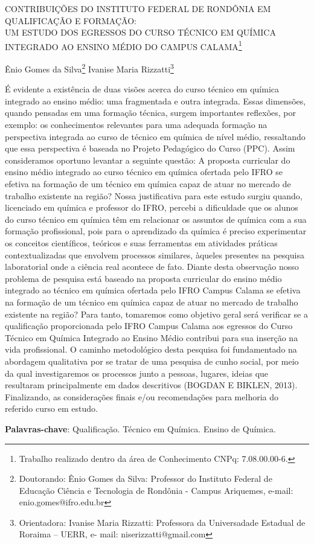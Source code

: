 \documentclass[article,12pt,onesidea,4paper,english,brazil]{abntex2}
\begin{document}
	
	
	\frenchspacing 
	
	\begin{center}
		\LARGE \MakeUppercase{Contribuições do Instituto Federal de Rondônia em qualificação e formação:}\\\MakeUppercase{
		um estudo dos egressos do Curso Técnico em Química Integrado ao Ensino Médio do Campus Calama}\footnote{Trabalho realizado dentro da área de Conhecimento CNPq: 7.08.00.00-6.}
		
		\normalsize
		Ênio Gomes da Silva\footnote{Doutorando: Ênio Gomes da Silva: Professor do Instituto Federal de Educação Ciência e Tecnologia de Rondônia - Campus Ariquemes, e-mail: enio.gomes@ifro.edu.br} 
		Ivanise Maria Rizzatti\footnote{Orientadora: Ivanise Maria Rizzatti: Professora da Universadade Estadual de Roraima – UERR, e-
			mail: niserizzatti@gmail.com} 
	\end{center}
	
	\noindent É evidente a existência de duas visões acerca do curso técnico em química integrado ao
	ensino médio: uma fragmentada e outra integrada. Essas dimensões, quando pensadas em
	uma formação técnica, surgem importantes reflexões, por exemplo: os conhecimentos
	relevantes para uma adequada formação na perspectiva integrada ao curso de técnico em
	química de nível médio, ressaltando que essa perspectiva é baseada no Projeto Pedagógico
	do Curso (PPC). Assim consideramos oportuno levantar a seguinte questão: A proposta
	curricular do ensino médio integrado ao curso técnico em química ofertada pelo IFRO se
	efetiva na formação de um técnico em química capaz de atuar no mercado de trabalho
	existente na região? Nossa justificativa para este estudo surgiu quando, licenciado em
	química e professor do IFRO, percebi a dificuldade que os alunos do curso técnico em
	química têm em relacionar os assuntos de química com a sua formação profissional, pois
	para o aprendizado da química é preciso experimentar os conceitos científicos, teóricos e
	suas ferramentas em atividades práticas contextualizadas que envolvem processos
	similares, àqueles presentes na pesquisa laboratorial onde a ciência real acontece de fato.
	Diante desta observação nosso problema de pesquisa está baseado na proposta curricular
	do ensino médio integrado ao técnico em química ofertada pelo IFRO Campus Calama se
	efetiva na formação de um técnico em química capaz de atuar no mercado de trabalho
	existente na região? Para tanto, tomaremos como objetivo geral será verificar se a
	qualificação proporcionada pelo IFRO Campus Calama aos egressos do Curso Técnico em
	Química Integrado ao Ensino Médio contribui para sua inserção na vida profissional. O
	caminho metodológico desta pesquisa foi fundamentado na abordagem qualitativa por se
	tratar de uma pesquisa de cunho social, por meio da qual investigaremos os processos junto
	a pessoas, lugares, ideias que resultaram principalmente em dados descritivos (BOGDAN E
	BIKLEN, 2013). Finalizando, as considerações finais e/ou recomendações para melhoria do
	referido curso em estudo.
	
	\vspace{\onelineskip}
	
	\noindent
	\textbf{Palavras-chave}: Qualificação. Técnico em Química. Ensino de Química.
	
\end{document}
